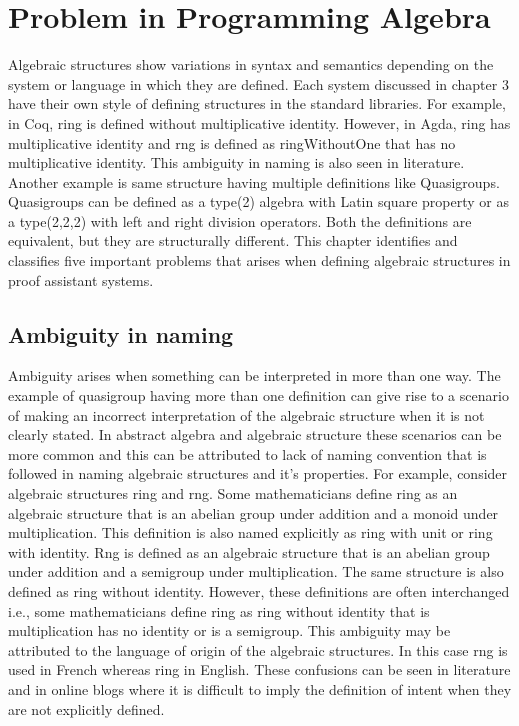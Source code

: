 \chapter{Problem in Programming Algebra}
Algebraic structures show variations in syntax and semantics depending on the
system or language in which they are defined. Each system discussed in chapter
3 have their own style of defining structures in the standard libraries. For
example, in Coq, ring is defined without multiplicative identity. However, in
Agda, ring has multiplicative identity and rng is defined as ringWithoutOne that
has no multiplicative identity. This ambiguity in naming is also seen in
literature. Another example is same structure having multiple definitions like
Quasigroups. Quasigroups can be defined as a type(2) algebra with Latin square
property or as a type(2,2,2) with left and right division operators. Both the
definitions are equivalent, but they are structurally different. This chapter
identifies and classifies five important problems that arises when defining
algebraic structures in proof assistant systems. 

\section{Ambiguity in naming}
Ambiguity arises when something can be interpreted in more than one way. The
example of quasigroup having more than one definition can give rise to a
scenario of making an incorrect interpretation of the algebraic structure when
it is not clearly stated. In abstract algebra and algebraic structure these
scenarios can be more common and this can be attributed to lack of naming
convention that is followed in naming algebraic structures and it's properties.
For example, consider algebraic structures ring and rng. Some mathematicians
define ring as an algebraic structure that is an abelian group under addition
and a monoid under multiplication. This definition is also named explicitly as
ring with unit or ring with identity. Rng is defined as an algebraic structure
that is an abelian group under addition and a semigroup under multiplication.
The same structure is also defined as ring without identity. However, these
definitions are often interchanged i.e., some mathematicians define ring as ring
without identity that is multiplication has no identity or is a semigroup. This
ambiguity may be attributed to the language of origin of the algebraic
structures. In this case rng is used in French whereas ring in English. These
confusions can be seen in literature and in online blogs where it is difficult
to imply the definition of intent when they are not explicitly defined. 

